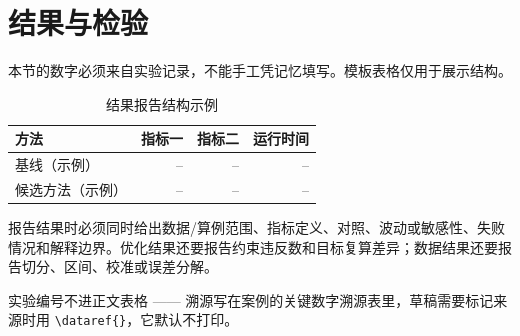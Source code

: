 \section{结果与检验}

本节的数字必须来自实验记录，不能手工凭记忆填写。模板表格仅用于展示结构。

\begin{table}[H]
  \centering
  \caption{结果报告结构示例}
  \label{tab:result-report}
  \begin{tabular}{p{}rrr}
    \toprule
    方法 & 指标一 & 指标二 & 运行时间 \\
    \midrule
    基线（示例） & -- & -- & -- \\
    候选方法（示例） & -- & -- & -- \\
    \bottomrule
  \end{tabular}
\end{table}

报告结果时必须同时给出数据/算例范围、指标定义、对照、波动或敏感性、失败情况和解释边界。优化结果还要报告约束违反数和目标复算差异；数据结果还要报告切分、区间、校准或误差分解。

实验编号不进正文表格 —— 溯源写在案例的关键数字溯源表里，草稿需要标记来源时用 \verb|\dataref{}|，它默认不打印。
